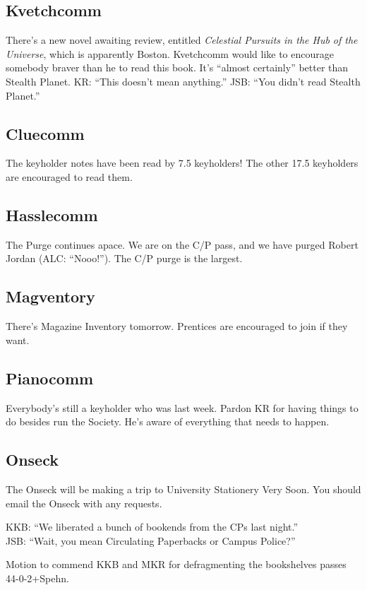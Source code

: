 \documentclass[10pt]{article}
\begin{document}
\subsection*{Kvetchcomm}
There's a new novel awaiting review, entitled \emph{Celestial Pursuits in the Hub of the Universe}, which is apparently Boston.  Kvetchcomm would like to encourage somebody braver than he to read this book.  It's ``almost certainly'' better than Stealth Planet. KR: ``This doesn't mean anything.'' JSB: ``You didn't read Stealth Planet.''

\subsection*{Cluecomm}
The keyholder notes have been read by 7.5 keyholders!  The other 17.5 keyholders are encouraged to read them.

\subsection*{Hasslecomm}
The Purge continues apace.  We are on the C/P pass, and we have purged Robert Jordan (ALC: ``Nooo!'').  The C/P purge is the largest.

\subsection*{Magventory} 
There's Magazine Inventory tomorrow.  Prentices are encouraged to join if they want.

\subsection*{Pianocomm}
Everybody's still a keyholder who was last week.  Pardon KR for having things to do besides run the Society.  He's aware of everything that needs to happen. 

\subsection*{Onseck}
The Onseck will be making a trip to University Stationery Very Soon.  You should email the Onseck with any requests. 

KKB: ``We liberated a bunch of bookends from the CPs last night.''\\
JSB: ``Wait, you mean Circulating Paperbacks or Campus Police?''

Motion to commend KKB and MKR for defragmenting the bookshelves passes 44-0-2+Spehn.
\end{document}

